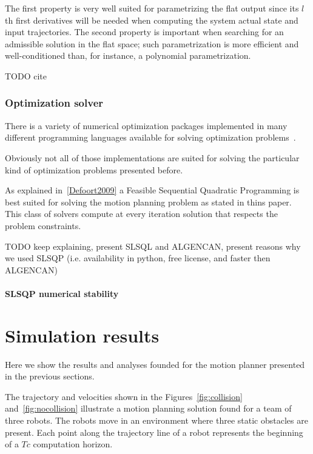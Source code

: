 \documentclass[eprint]{actapoly}
\begin{document}
The first property is very well suited for parametrizing the flat output since
its $l$th first derivatives will be needed when computing the system actual state
and input trajectories. The second property is important when searching for an
admissible solution in the flat space; such parametrization is more efficient
and well-conditioned than, for instance, a polynomial parametrization.

TODO cite

\subsubsection{Optimization solver}

There is a variety of numerical optimization packages implemented in many different programming languages available for solving optimization problems~\cite{pyopt-paper}.

Obviously not all of those implementations are suited for solving
the particular kind of optimization problems presented before.

As explained in~\ref{Defoort2009} a Feasible Sequential Quadratic Programming is best suited for solving the motion
planning problem as stated in thins paper. 
This class of solvers compute at every iteration solution
that respects the problem constraints.

TODO keep explaining, present SLSQL and ALGENCAN, present reasons why we used SLSQP (i.e. availability in python, free license, and faster then ALGENCAN)

\paragraph{SLSQP numerical stability}





\section{Simulation results}

Here we show the results and analyses founded for the motion planner presented
in the previous sections.

The trajectory and velocities shown in the Figures~\ref{fig:collision} and~\ref{fig:nocollision}
illustrate a motion planning solution found for a team of three robots.
The robots move in an environment where three static obstacles are present.
Each point along the trajectory line of a robot represents the beginning
of a $Tc$ computation horizon.
\end{document}
